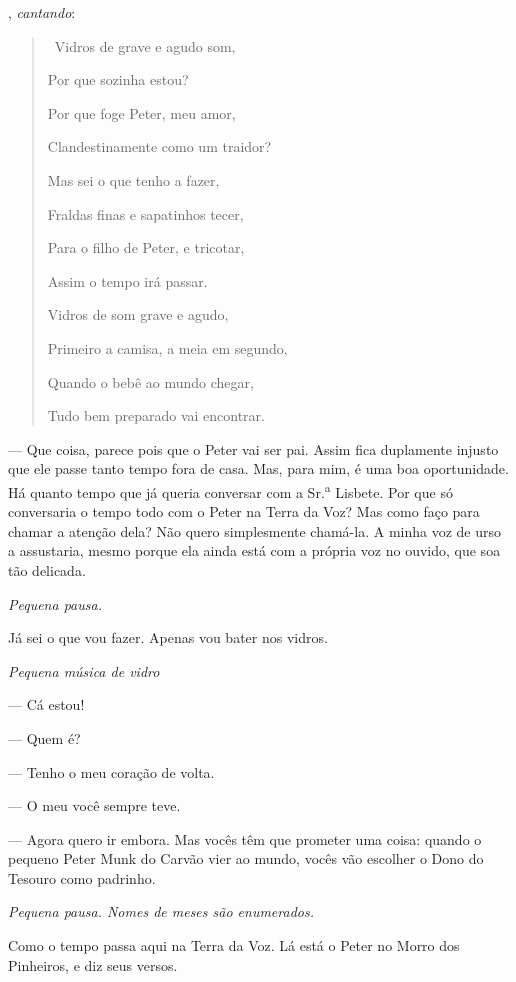 \begin{myparindent}{0pt}
\begin{Parskip}
, \emph{cantando}:

\begin{quote}
\quad \, Vidros de grave e agudo som,

Por que sozinha estou?

Por que foge Peter, meu amor,

Clandestinamente como um traidor?

Mas sei o que tenho a fazer,

Fraldas finas e sapatinhos tecer,

Para o filho de Peter, e tricotar,

Assim o tempo irá passar.

Vidros de som grave e agudo,

Primeiro a camisa, a meia em segundo,

Quando o bebê ao mundo chegar,

Tudo bem preparado vai encontrar.

\end{quote}

 --- Que coisa, parece pois que o Peter vai ser pai. Assim fica
duplamente injusto que ele passe tanto tempo fora de casa. Mas, para
mim, é uma boa oportunidade. Há quanto tempo que já queria conversar com
a Sr.\textsuperscript{a} Lisbete. Por que só conversaria o tempo todo
com o Peter na Terra da Voz? Mas como faço para chamar a atenção dela?
Não quero simplesmente chamá-la. A minha voz de urso a assustaria, mesmo
porque ela ainda está com a própria voz no ouvido, que soa tão delicada.

\emph{Pequena pausa.}

Já sei o que vou fazer. Apenas vou bater nos vidros.

\emph{Pequena música de vidro}

 --- Cá estou!

 --- Quem é?

 --- Tenho o meu coração de volta.

 --- O meu você sempre teve.

 --- Agora quero ir embora. Mas vocês têm que prometer uma coisa:
quando o pequeno Peter Munk do Carvão vier ao mundo, vocês vão escolher
o Dono do Tesouro como padrinho.

\emph{Pequena pausa. Nomes de meses são enumerados.}

Como o tempo passa aqui na Terra da Voz. Lá está o Peter no Morro dos
Pinheiros, e diz seus versos.


\end{Parskip}
\end{myparindent}
